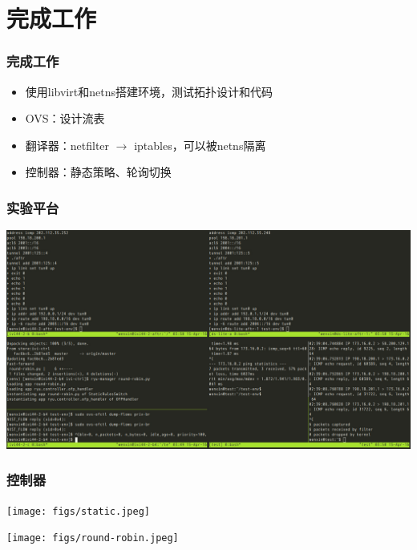 \documentclass{beamer}
\begin{document}
\section{完成工作}
\begin{frame}
  \frametitle{完成工作}

  \begin{block}{}
    \begin{itemize}
    \item 使用libvirt和netns搭建环境，测试拓扑设计和代码
    \item OVS：设计流表
    \item 翻译器：netfilter $\rightarrow$ iptables，可以被netns隔离
    \item 控制器：静态策略、轮询切换
    \end{itemize}
  \end{block}
\end{frame}

\begin{frame}
  \frametitle{实验平台}

  \begin{center}
    \includegraphics[width=\textwidth]{figs/test-env.jpeg}
  \end{center}
\end{frame}

\begin{frame}
  \frametitle{控制器}

  \begin{center}
    \texttt{[image: figs/static.jpeg]}
  \end{center}

  \begin{center}
    \texttt{[image: figs/round-robin.jpeg]}  
  \end{center}
  
\end{frame}
\end{document}
